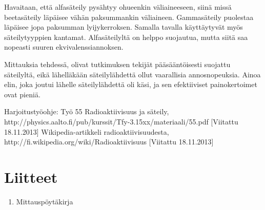 \documentclass[a4paper,11pt]{article}
\begin{document}
Havaitaan, että alfasäteily pysähtyy ohueenkin väliaineeseen, siinä missä beetasäteily läpäisee vähän paksummankin väliaineen. Gammasäteily puolestaa läpäisee jopa paksumman lyijykerroksen. Samalla tavalla käyttäytyvät myös säteilytyyppien kantamat. Alfasäteilyltä on helppo suojautua, mutta siitä saa nopeasti suuren ekvivalenssiannoksen. 

Mittauksia tehdessä, olivat tutkimuksen tekijät pääsääntöisesti suojattu säteilyltä, eikä lähelläkään säteilylähdettä ollut vaarallisia annosnopeuksia. Ainoa elin, joka joutui lähelle säteilylähdettä oli käsi, ja sen efektiiviset painokertoimet ovat pieniä. 


\begin{thebibliography}{99}

 Harjoitustyöohje: Työ 55 Radioaktiivisuus ja säteily, http://physics.aalto.fi/pub/kurssit/Tfy-3.15xx/materiaali/55.pdf [Viitattu 18.11.2013]
 Wikipedia-artikkeli radioaktiivisuudesta, http://fi.wikipedia.org/wiki/Radioaktiivisuus [Viitattu 18.11.2013]

\end{thebibliography}

\section*{Liitteet}
\begin{enumerate}
\item{Mittauspöytäkirja}\label{mittaus}

\end{enumerate}
\end{document}

